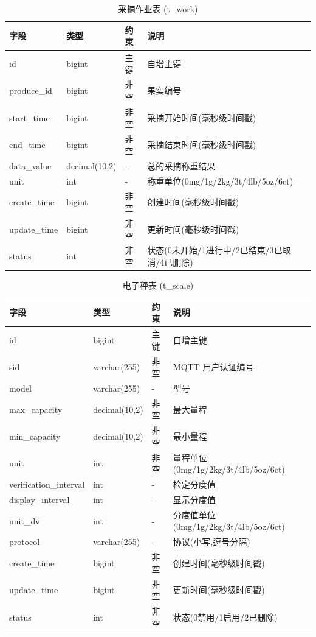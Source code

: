 \begin{table}[H]
\centering
\caption{采摘作业表 (t\_work)}
\begin{tabular}{|l|l|l|l|}
\hline
字段 & 类型 & 约束 & 说明 \\
\hline
id & bigint & 主键 & 自增主键 \\
produce\_id & bigint & 非空 & 果实编号 \\
start\_time & bigint & 非空 & 采摘开始时间(毫秒级时间戳) \\
end\_time & bigint & 非空 & 采摘结束时间(毫秒级时间戳) \\
data\_value & decimal(10,2) & - & 总的采摘称重结果 \\
unit & int & - & 称重单位(0mg/1g/2kg/3t/4lb/5oz/6ct) \\
create\_time & bigint & 非空 & 创建时间(毫秒级时间戳) \\
update\_time & bigint & 非空 & 更新时间(毫秒级时间戳) \\
status & int & 非空 & 状态(0未开始/1进行中/2已结束/3已取消/4已删除) \\
\hline
\end{tabular}
\end{table}

\begin{table}[H]
\centering
\caption{电子秤表 (t\_scale)}
\begin{tabular}{|l|l|l|l|}
\hline
字段 & 类型 & 约束 & 说明 \\
\hline
id & bigint & 主键 & 自增主键 \\
sid & varchar(255) & 非空 & MQTT 用户认证编号 \\
model & varchar(255) & - & 型号 \\
max\_capacity & decimal(10,2) & 非空 & 最大量程 \\
min\_capacity & decimal(10,2) & 非空 & 最小量程 \\
unit & int & 非空 & 量程单位(0mg/1g/2kg/3t/4lb/5oz/6ct) \\
verification\_interval & int & - & 检定分度值 \\
display\_interval & int & - & 显示分度值 \\
unit\_dv & int & - & 分度值单位(0mg/1g/2kg/3t/4lb/5oz/6ct) \\
protocol & varchar(255) & - & 协议(小写,逗号分隔) \\
create\_time & bigint & 非空 & 创建时间(毫秒级时间戳) \\
update\_time & bigint & 非空 & 更新时间(毫秒级时间戳) \\
status & int & 非空 & 状态(0禁用/1启用/2已删除) \\
\hline
\end{tabular}
\end{table}


